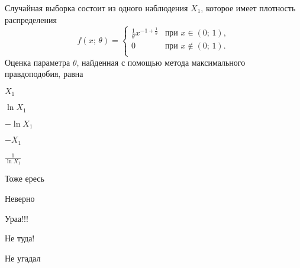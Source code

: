 
\begin{question}
Случайная выборка состоит из одного наблюдения \(X_1\), которое имеет
плотность распределения \[
    f(x; \, \theta) = \begin{cases}
                          \frac{1}{\theta}x^{-1 + \frac{1}{\theta}} & \text{при } x \in (0;\,1),  \\
                          0 & \text{при }x \not\in (0;\,1). \\
                        \end{cases}
\] Оценка параметра \(\theta\), найденная с помощью метода максимального
правдоподобия, равна
\begin{answerlist}
  \item \(X_1\)
  \item \(\ln X_1\)
  \item \(-\ln X_1\)
  \item \(-X_1\)
  \item \(\frac{1}{\ln X_1}\)
\end{answerlist}
\end{question}

\begin{solution}
\begin{answerlist}
  \item Тоже ересь
  \item Неверно
  \item Ураа!!!
  \item Не туда!
  \item Не угадал
\end{answerlist}
\end{solution}

